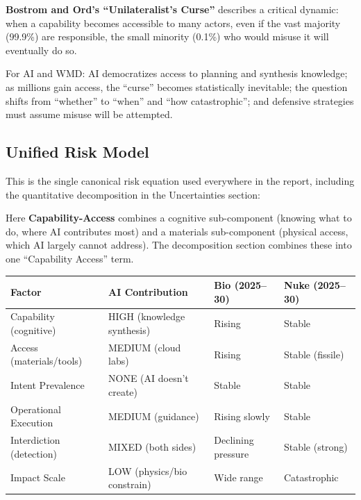 \documentclass[11pt,letterpaper]{article}
\begin{document}
\textbf{Bostrom and Ord's ``Unilateralist's Curse''} describes a critical dynamic: when a capability becomes accessible to many actors, even if the vast majority (99.9\%) are responsible, the small minority (0.1\%) who would misuse it will eventually do so.

For AI and WMD: AI democratizes access to planning and synthesis knowledge; as millions gain access, the ``curse'' becomes statistically inevitable; the question shifts from ``whether'' to ``when'' and ``how catastrophic''; and defensive strategies must assume misuse will be attempted.

\subsection{Unified Risk Model}

This is the single canonical risk equation used everywhere in the report, including the quantitative decomposition in the Uncertainties section:

\begin{center}
\end{center}

Here \textbf{Capability-Access} combines a cognitive sub-component (knowing what to do, where AI contributes most) and a materials sub-component (physical access, which AI largely cannot address). The decomposition section combines these into one ``Capability Access'' term.

\begin{center}
\small
\begin{tabular}{L{3cm}L{3.5cm}L{2.5cm}L{2.5cm}}
\toprule
\textbf{Factor} & \textbf{AI Contribution} & \textbf{Bio (2025--30)} & \textbf{Nuke (2025--30)} \\
\midrule
Capability (cognitive) & HIGH (knowledge synthesis) & Rising & Stable \\
Access (materials/tools) & MEDIUM (cloud labs) & Rising & Stable (fissile) \\
Intent Prevalence & NONE (AI doesn't create) & Stable & Stable \\
Operational Execution & MEDIUM (guidance) & Rising slowly & Stable \\
Interdiction (detection) & MIXED (both sides) & Declining pressure & Stable (strong) \\
Impact Scale & LOW (physics/bio constrain) & Wide range & Catastrophic \\
\bottomrule
\end{tabular}
\end{center}
\end{document}
